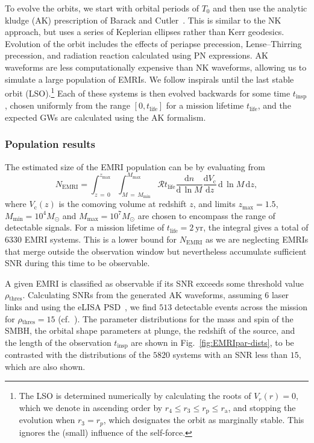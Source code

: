 \documentclass[aps,prd,amsfonts,amssymb,amsmath,nofootinbib,showpacs,superscriptaddress,twocolumn,floatfix]{revtex4-1}
\newcommand{\figref}[1]{Fig.~\ref{fig:#1}}
\newcommand{\units}[1]{\ensuremath{~\mathrm{#1}}}
\newcommand{\sub}[1]{\ensuremath{_\mathrm{#1}}}
\newcommand{\dd}{\ensuremath{\mathrm{d}}}
\newcommand{\diff}[2]{\ensuremath{\dfrac{\dd {#1}}{\dd {#2}}}}
\newcommand{\intd}[4]{\ensuremath{\int_{#1}^{#2}{#3}\,\dd{#4}}}
\begin{document}
To evolve the orbits, we start with orbital periods of $T_0$ and then use the analytic kludge (AK) prescription of Barack and Cutler~\cite{Barack2004}. This is similar to the NK approach, but uses a series of Keplerian ellipses rather than Kerr geodesics. Evolution of the orbit includes the effects of periapse precession, Lense--Thirring
precession, and radiation reaction calculated using PN expressions. AK waveforms are less computationally expensive than NK waveforms, allowing us to simulate a large population of EMRIs. We follow inspirals until the last stable orbit (LSO).\footnote{The LSO is determined numerically by calculating the roots of $V_r(r) = 0$, which we denote in ascending order by $r_4 \leq r_3 \leq r\sub{p} \leq r\sub{a}$, and stopping the evolution when $r_3 = r_p$, which designates the orbit as marginally stable. This ignores the (small) influence of the self-force.} Each of these systems is then evolved backwards for some time $t\sub{insp}$, chosen uniformly from the range $[0,t\sub{life}]$ for a mission lifetime $t\sub{life}$, and the expected GWs are calculated using the AK formalism.

\subsubsection{Population results}

The estimated size of the EMRI population can be by evaluating from~\cite{Gair2009}
\begin{equation}
\label{eq:EMRI-number}
N\sub{EMRI} = \intd{z\,=\,0}{z\sub{max}}{ \intd{M\,=\,M\sub{min}}{M\sub{max}}{\mathcal{R}t\sub{life}\diff{n}{\,\ln M} \diff{V\sub{c}}{z}}{\,\ln M}}{z},
\end{equation}
where $V\sub{c}(z)$ is the comoving volume at redshift $z$, and limits $z\sub{max} = 1.5$, $M\sub{min} = 10^4 M_\odot$ and $M\sub{max} = 10^7 M_\odot$ are chosen to encompass the range of detectable signals. For a mission lifetime of $t\sub{life} = 2\units{yr}$, the integral gives a total of $6330$ EMRI systems. This is a lower bound for $N\sub{EMRI}$ as we are neglecting EMRIs that merge outside the observation window but nevertheless accumulate sufficient SNR during this time to be observable.

A given EMRI is classified as observable if its SNR exceeds some threshold value $\rho\sub{thres}$. Calculating SNRs from the generated AK waveforms, assuming $6$ laser links and using the eLISA PSD~\cite{Amaro-Seoane2012a}, we find $513$ detectable events across the mission for $\rho\sub{thres} = 15$ (cf.\ \cite{Gair2004,Amaro-Seoane2012a,Mapelli2012}). The parameter distributions for the mass and spin of the SMBH, the orbital shape parameters at plunge, the redshift of the source, and the length of the observation $t\sub{insp}$ are shown in \figref{EMRIpar-dists}, to be contrasted with the distributions of the $5820$ systems with an SNR less than $15$, which are also shown.%
\end{document}
